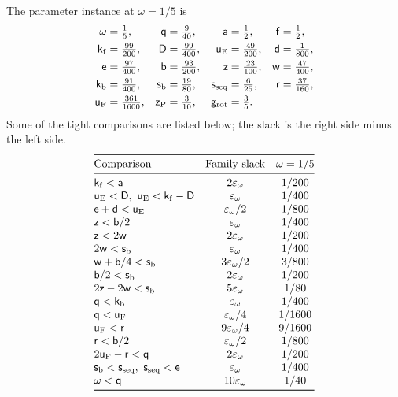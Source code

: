 The parameter instance at $\omega=1/5$ is
\begin{equation}\label{u:eq:parameter-instance}
 \begin{aligned}
 \omega&=\tfrac15,& \mathsf{q}&=\tfrac9{40},&
 \mathsf{a}&=\tfrac12,& \mathsf{f}&=\tfrac12,\\
 \mathsf{k}_{\rm f}&=\tfrac{99}{200},& \mathsf{D}&=\tfrac{99}{400},&
 \mathsf{u}_{\rm E}&=\tfrac{49}{200},& \mathsf{d}&=\tfrac1{800},\\
 \mathsf{e}&=\tfrac{97}{400},& \mathsf{b}&=\tfrac{93}{200},&
 \mathsf{z}&=\tfrac{23}{100},& \mathsf{w}&=\tfrac{47}{400},\\
 \mathsf{k}_{\rm b}&=\tfrac{91}{400},& \mathsf{s}_{\rm b}&=\tfrac{19}{80},&
 \mathsf{s}_{\rm seq}&=\tfrac6{25},& \mathsf{r}&=\tfrac{37}{160},\\
 \mathsf{u}_{\rm F}&=\tfrac{361}{1600},& \mathsf{z}_{\rm P}&=\tfrac3{10},&
 \mathsf{g}_{\rm rot}&=\tfrac35.
 \end{aligned}
\end{equation}
Some of the tight comparisons are listed below; the slack is the
right side minus the left side.
\begin{equation}\label{u:eq:representative-slacks}
\begin{array}{@{}lcc@{}}
\toprule
\text{Comparison}&\text{Family slack}&\omega=1/5\\
\midrule
 \ex k_{\rm f}<\ex a&2\varepsilon_\omega&1/200\\
 \ex u_{\rm E}<\ex D,\ \ex u_{\rm E}<\ex k_{\rm f}-\ex D
     &\varepsilon_\omega&1/400\\
 \ex e+\ex d<\ex u_{\rm E}&\varepsilon_\omega/2&1/800\\
 \ex z<\ex b/2&\varepsilon_\omega&1/400\\
 \ex z<2\ex w&2\varepsilon_\omega&1/200\\
 2\ex w<\ex s_{\rm b}&\varepsilon_\omega&1/400\\
 \ex w+\ex b/4<\ex s_{\rm b}&3\varepsilon_\omega/2&3/800\\
 \ex b/2<\ex s_{\rm b}&2\varepsilon_\omega&1/200\\
 2\ex z-2\ex w<\ex s_{\rm b}&5\varepsilon_\omega&1/80\\
 \ex q<\ex k_{\rm b}&\varepsilon_\omega&1/400\\
 \ex q<\ex u_{\rm F}&\varepsilon_\omega/4&1/1600\\
 \ex u_{\rm F}<\ex r&9\varepsilon_\omega/4&9/1600\\
 \ex r<\ex b/2&\varepsilon_\omega/2&1/800\\
 2\ex u_{\rm F}-\ex r<\ex q&2\varepsilon_\omega&1/200\\
 \ex s_{\rm b}<\ex s_{\rm seq},\ \ex s_{\rm seq}<\ex e
     &\varepsilon_\omega&1/400\\
 \omega<\ex q&10\varepsilon_\omega&1/40\\
\bottomrule
\end{array}
\end{equation}
